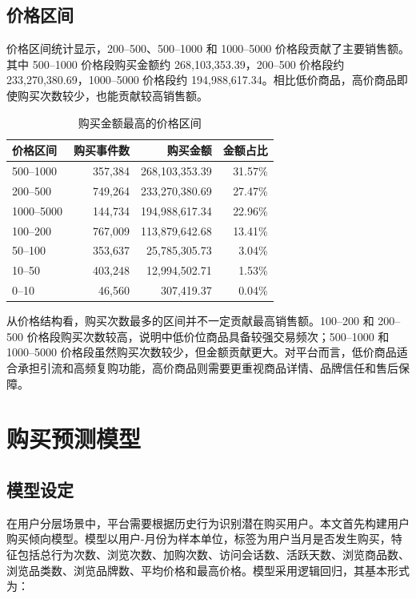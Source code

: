 \documentclass[12pt,hyperref,a4paper,UTF8]{ctexart}
\begin{document}
\subsection{价格区间}

价格区间统计显示，200--500、500--1000 和 1000--5000 价格段贡献了主要销售额。其中 500--1000 价格段购买金额约 268,103,353.39，200--500 价格段约 233,270,380.69，1000--5000 价格段约 194,988,617.34。相比低价商品，高价商品即使购买次数较少，也能贡献较高销售额。

\begin{table}[H]
\centering
\caption{购买金额最高的价格区间}
\begin{tabular}{lrrr}
\toprule
价格区间 & 购买事件数 & 购买金额 & 金额占比 \\
\midrule
500--1000 & 357,384 & 268,103,353.39 & 31.57\% \\
200--500 & 749,264 & 233,270,380.69 & 27.47\% \\
1000--5000 & 144,734 & 194,988,617.34 & 22.96\% \\
100--200 & 767,009 & 113,879,642.68 & 13.41\% \\
50--100 & 353,637 & 25,785,305.73 & 3.04\% \\
10--50 & 403,248 & 12,994,502.71 & 1.53\% \\
0--10 & 46,560 & 307,419.37 & 0.04\% \\
\bottomrule
\end{tabular}
\end{table}

从价格结构看，购买次数最多的区间并不一定贡献最高销售额。100--200 和 200--500 价格段购买次数较高，说明中低价位商品具备较强交易频次；500--1000 和 1000--5000 价格段虽然购买次数较少，但金额贡献更大。对平台而言，低价商品适合承担引流和高频复购功能，高价商品则需要更重视商品详情、品牌信任和售后保障。

\section{购买预测模型}

\subsection{模型设定}

在用户分层场景中，平台需要根据历史行为识别潜在购买用户。本文首先构建用户购买倾向模型。模型以用户-月份为样本单位，标签为用户当月是否发生购买，特征包括总行为次数、浏览次数、加购次数、访问会话数、活跃天数、浏览商品数、浏览品类数、浏览品牌数、平均价格和最高价格。模型采用逻辑回归，其基本形式为：
\end{document}
